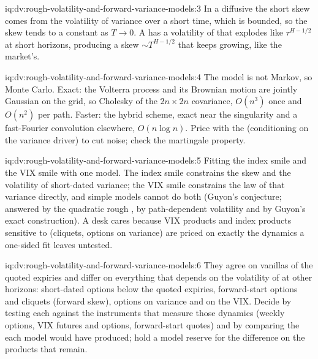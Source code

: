 \begin{solution}{iq:dv:rough-volatility-and-forward-variance-models:3}
In a diffusive  the short skew comes from the volatility of variance over a short time,
which is bounded, so the skew tends to a constant as $T\to0$. A  has a volatility of  that explodes like $\tau^{H-1/2}$ at short horizons, producing a skew $\sim T^{H-1/2}$ that keeps
growing, like the market's.
\end{solution}

\begin{solution}{iq:dv:rough-volatility-and-forward-variance-models:4}
The model is not Markov, so Monte Carlo. Exact: the Volterra process and its Brownian motion are jointly Gaussian on
the grid, so Cholesky of the $2n\times2n$ covariance, $O(n^3)$ once and $O(n^2)$ per path. Faster: the hybrid scheme,
exact near the singularity and a fast-Fourier convolution elsewhere, $O(n\log n)$. Price with the 
(conditioning on the variance driver) to cut noise; check the martingale property.
\end{solution}

\begin{solution}{iq:dv:rough-volatility-and-forward-variance-models:5}
Fitting the index smile and the VIX smile with one model. The index smile constrains the skew and the volatility of
short-dated variance; the VIX smile constrains the law of that variance directly, and simple models cannot do both
(Guyon's conjecture; answered by the quadratic rough , by path-dependent volatility and by Guyon's exact
construction). A desk cares because VIX products and index products sensitive to 
(cliquets, options on variance) are priced on exactly the dynamics a one-sided fit leaves untested.
\end{solution}

\begin{solution}{iq:dv:rough-volatility-and-forward-variance-models:6}
They agree on vanillas of the quoted expiries and differ on everything that depends on the volatility of  at other horizons: short-dated options below the quoted expiries, forward-start options and cliquets
(forward skew), options on variance and on the VIX. Decide by testing each against the instruments that measure
those dynamics (weekly options, VIX futures and options, forward-start quotes) and by comparing the 
each model would have produced; hold a model reserve for the difference on the products that remain.
\end{solution}
